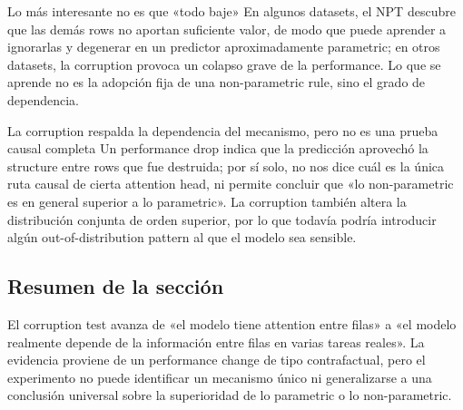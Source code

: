\begin{importantbox}{Lo más interesante no es que «todo baje»}
En algunos datasets, el NPT descubre que las demás rows no aportan suficiente valor, de modo que puede aprender a ignorarlas y degenerar en un predictor aproximadamente parametric; en otros datasets, la corruption provoca un colapso grave de la performance. Lo que se aprende no es la adopción fija de una non-parametric rule, sino el grado de dependencia.
\end{importantbox}

\begin{warningbox}{La corruption respalda la dependencia del mecanismo, pero no es una prueba causal completa}
Un performance drop indica que la predicción aprovechó la structure entre rows que fue destruida; por sí solo, no nos dice cuál es la única ruta causal de cierta attention head, ni permite concluir que «lo non-parametric es en general superior a lo parametric». La corruption también altera la distribución conjunta de orden superior, por lo que todavía podría introducir algún out-of-distribution pattern al que el modelo sea sensible.
\end{warningbox}


\subsection{Resumen de la sección}

El corruption test avanza de «el modelo tiene attention entre filas» a «el modelo realmente depende de la información entre filas en varias tareas reales». La evidencia proviene de un performance change de tipo contrafactual, pero el experimento no puede identificar un mecanismo único ni generalizarse a una conclusión universal sobre la superioridad de lo parametric o lo non-parametric.
